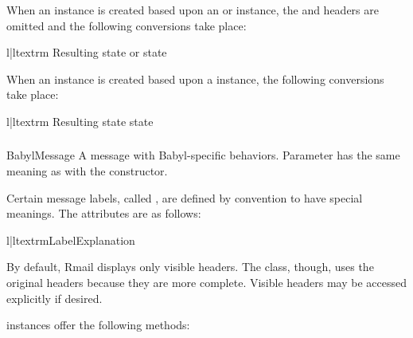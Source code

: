 When an  instance is created based upon an 
or  instance, the  and
 headers are omitted and the following conversions take
place:

\begin{tableii}{l|l}{textrm}
    {Resulting state}{ or  state}
\end{tableii}

When an  instance is created based upon a 
instance, the following conversions take place:

\begin{tableii}{l|l}{textrm}
    {Resulting state}{ state}
\end{tableii}

\subsubsection{}
\label{mailbox-babylmessage}

\begin{classdesc}{BabylMessage}{}
A message with Babyl-specific behaviors. Parameter  has the same
meaning as with the  constructor.
\end{classdesc}

Certain message labels, called , are defined by convention to
have special meanings. The attributes are as follows:

\begin{tableii}{l|l}{textrm}{Label}{Explanation}
\end{tableii}

By default, Rmail displays only
visible headers. The  class, though, uses the original
headers because they are more complete. Visible headers may be accessed
explicitly if desired.

 instances offer the following methods:

